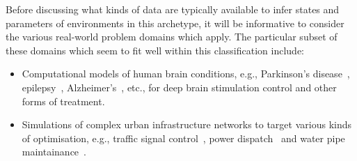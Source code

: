 Before discussing what kinds of data are typically available to infer states and parameters of environments in this archetype, it will be informative to consider the various real-world problem domains which apply. The particular subset of these domains which seem to fit well within this classification include:
\begin{itemize}
\item{Computational models of human brain conditions, e.g., Parkinson's disease~\cite{lu2019application}, epilepsy~\cite{pineau2009treating}, Alzheimer's~\cite{saboo2021reinforcement}, etc., for deep brain stimulation control and other forms of treatment.}
\item{Simulations of complex urban infrastructure networks to target various kinds of optimisation, e.g., traffic signal control~\cite{yau2017survey}, power dispatch~\cite{li2021integrating} and water pipe maintainance~\cite{bukhsh2023maintenance}.}
\end{itemize}
